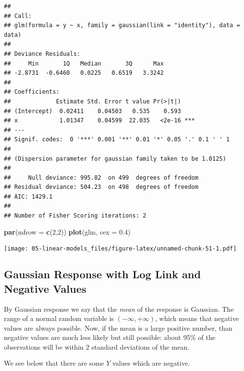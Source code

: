 \documentclass[openany]{book}
\newenvironment{Shaded}{\begin{snugshade}}{\end{snugshade}}
\newcommand{\ControlFlowTok}[1]{\textcolor[rgb]{0.13,0.29,0.53}{\textbf{#1}}}
\newcommand{\DataTypeTok}[1]{\textcolor[rgb]{0.13,0.29,0.53}{#1}}
\newcommand{\DecValTok}[1]{\textcolor[rgb]{0.00,0.00,0.81}{#1}}
\newcommand{\FloatTok}[1]{\textcolor[rgb]{0.00,0.00,0.81}{#1}}
\newcommand{\KeywordTok}[1]{\textcolor[rgb]{0.13,0.29,0.53}{\textbf{#1}}}
\newcommand{\NormalTok}[1]{#1}
\newcommand{\OperatorTok}[1]{\textcolor[rgb]{0.81,0.36,0.00}{\textbf{#1}}}
\newcommand{\StringTok}[1]{\textcolor[rgb]{0.31,0.60,0.02}{#1}}
\begin{document}
\begin{verbatim}
## 
## Call:
## glm(formula = y ~ x, family = gaussian(link = "identity"), data = data)
## 
## Deviance Residuals: 
##     Min       1Q   Median       3Q      Max  
## -2.8731  -0.6460   0.0225   0.6519   3.3242  
## 
## Coefficients:
##             Estimate Std. Error t value Pr(>|t|)    
## (Intercept)  0.02411    0.04503   0.535    0.593    
## x            1.01347    0.04599  22.035   <2e-16 ***
## ---
## Signif. codes:  0 '***' 0.001 '**' 0.01 '*' 0.05 '.' 0.1 ' ' 1
## 
## (Dispersion parameter for gaussian family taken to be 1.0125)
## 
##     Null deviance: 995.82  on 499  degrees of freedom
## Residual deviance: 504.23  on 498  degrees of freedom
## AIC: 1429.1
## 
## Number of Fisher Scoring iterations: 2
\end{verbatim}

\begin{Shaded}
\begin{Highlighting}[]
\KeywordTok{par}\NormalTok{(}\DataTypeTok{mfrow =} \KeywordTok{c}\NormalTok{(}\DecValTok{2}\NormalTok{,}\DecValTok{2}\NormalTok{))}
\KeywordTok{plot}\NormalTok{(glm, }\DataTypeTok{cex =} \FloatTok{0.4}\NormalTok{)}
\end{Highlighting}
\end{Shaded}

\texttt{[image: 05-linear-models\_files/figure-latex/unnamed-chunk-51-1.pdf]}

\hypertarget{gaussian-response-with-log-link-and-negative-values}{%
\subsection{Gaussian Response with Log Link and Negative Values}\label{gaussian-response-with-log-link-and-negative-values}}

By Gaussian response we say that the \emph{mean} of the response is Gaussian. The range of a normal random variable is \((-\infty, +\infty)\), which means that negative values are always possible. Now, if the mean is a large positive number, than negative values are much less likely but still possible: about 95\% of the observations will be within 2 standard deviations of the mean.

We see below that there are some \(Y\) values which are negative.

\begin{Shaded}
\end{Shaded}
\end{document}
